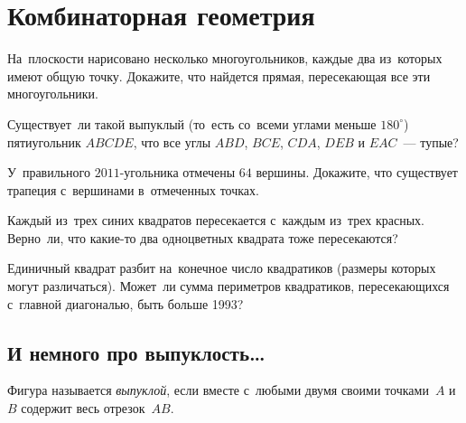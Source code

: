 

\section*{Комбинаторная геометрия}


\begin{problems}

\item
На~плоскости нарисовано несколько многоугольников, каждые два из~которых имеют
общую точку.
Докажите, что найдется прямая, пересекающая все эти многоугольники.

\item
Существует~ли такой выпуклый (то~есть со~всеми углами меньше $180^\circ$)
пятиугольник $ABCDE$, что все углы
$ABD$, $BCE$, $CDA$, $DEB$ и $EAC$~--- тупые?

\item
У~правильного $2011$-угольника отмечены $64$ вершины.
Докажите, что существует трапеция с~вершинами в~отмеченных точках.

\item
Каждый из~трех синих квадратов пересекается с~каждым из~трех красных.
Верно~ли, что какие-то два одноцветных квадрата тоже пересекаются?

\item
Единичный квадрат разбит на~конечное число квадратиков
(размеры которых могут различаться).
Может~ли сумма периметров квадратиков, пересекающихся с~главной диагональю,
быть больше 1993?

\end{problems}

\subsection*{И немного про выпуклость\ldots}

Фигура называется \emph{выпуклой}, если вместе с~любыми двумя своими
точками~$A$ и~$B$ содержит весь отрезок~$AB$.

